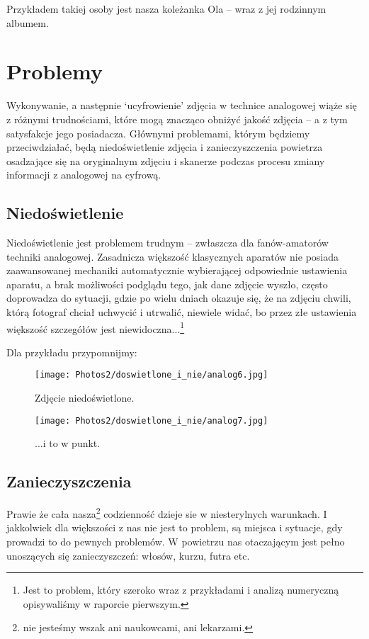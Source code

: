 \documentclass[]{mwart}
\begin{document}
Przykładem takiej osoby jest nasza koleżanka Ola -- wraz z jej rodzinnym albumem.

\section{Problemy}
Wykonywanie, a następnie `ucyfrowienie' zdjęcia w technice analogowej wiąże się z różnymi trudnościami,
które mogą znacząco obniżyć jakość zdjęcia -- a z tym satysfakcje jego posiadacza. Głównymi problemami,
którym będziemy przeciwdziałać, będą niedoświetlenie zdjęcia i zanieczyszczenia powietrza osadzające
się na oryginalnym zdjęciu i skanerze podczas procesu zmiany informacji z analogowej na cyfrową.

\subsection{Niedoświetlenie} %
Niedoświetlenie jest problemem trudnym -- zwłaszcza dla fanów-amatorów techniki analogowej.
Zasadnicza większość klasycznych aparatów nie posiada zaawansowanej mechaniki automatycznie wybierającej
odpowiednie ustawienia aparatu, a brak możliwości podglądu tego, jak dane zdjęcie wyszło, często doprowadza
do sytuacji, gdzie po wielu dniach okazuje się, że na zdjęciu chwili, którą fotograf chciał uchwycić i utrwalić,
niewiele widać, bo przez złe ustawienia większość szczegółów jest niewidoczna...\footnote{Jest to problem, który szeroko
    wraz z przykładami i analizą numeryczną opisywaliśmy w raporcie pierwszym.}

Dla przykładu przypomnijmy:
\newpage
\begin{figure}[H]
    \centering
    \texttt{[image: Photos2/doswietlone\_i\_nie/analog6.jpg]}
    \caption{Zdjęcie niedoświetlone.}
\end{figure}
\begin{figure}[H]
    \centering
    \texttt{[image: Photos2/doswietlone\_i\_nie/analog7.jpg]}
    \caption{...i to w punkt.}
\end{figure}

\newpage
\subsection{Zanieczyszczenia}
Prawie że cała nasza\footnote{nie jesteśmy wszak ani naukowcami, ani lekarzami.} codzienność
dzieje sie w niesterylnych warunkach. I jakkolwiek dla większości z nas nie jest to problem, są miejsca i sytuacje,
gdy prowadzi to do pewnych problemów. W powietrzu nas otaczającym jest pełno unoszących się zanieczyszczeń: włosów, kurzu, futra etc.
\end{document}
